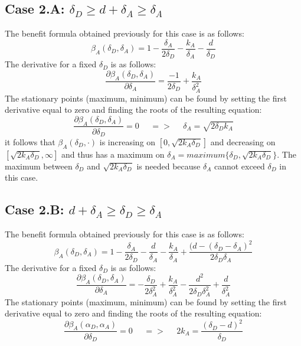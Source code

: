 \subsection*{Case 2.A: $\delta_{D} \geq d+\delta_{A} \geq \delta_{A} $ }
The benefit formula obtained previously for this case is as follows:
\begin{equation*}
\beta_{A}(\delta_{D},\delta_{A}) =1- \dfrac{\delta_{A}}{2\delta_{D}} - \dfrac{k_{A}}{\delta_{A}} - \dfrac{d}{\delta_{D}}
\end{equation*}
The derivative for a fixed $\delta_{D}$ is as follows:
\begin{equation*}
\dfrac{\partial \beta_{A}(\delta_{D},\delta_{A})}{\partial \delta_{A}} = \dfrac{-1}{2\delta_{D}} + \dfrac{k_{A}}{\delta_{A}^{2}}
\end{equation*}
The stationary points (maximum, minimum) can be found by setting the first derivative equal to zero and finding the roots of the resulting equation:
\begin{equation*}
\frac{\partial \beta_{A}(\delta_{D},\delta_{A})}{\partial \delta_{D}} =0 ~~~~~~ =>~~~~~~ \delta_{A} = \sqrt{2\delta_{D}k_{A}}
\end{equation*}
it follows that $\beta_{A}(\delta_{D},\cdot)$ is increasing on $[0,\sqrt{2k_{A}\delta_{D}}]$ and decreasing on $[\sqrt{2k_{A}\delta_{D}}, \infty]$ and thus has a maximum on $\delta_{A} = maximum \{\delta_{D}, \sqrt{2k_{A}\delta_{D}} \} $. The maximum between $\delta_{D}$ and $ \sqrt{2k_{A}\delta_{D}}$ is needed because $\delta_{A} $ cannot exceed $\delta_{D}$ in this case. \\

\subsection*{Case 2.B: $d+\delta_{A} \geq \delta_{D} \geq  \delta_{A} $} 

The benefit formula obtained previously for this case is as follows: 
\begin{equation*}
\beta_{A}(\delta_{D},\delta_{A}) = 1 - \dfrac{\delta_{A}}{2\delta_{D}} - \dfrac{d}{\delta_{A}} - \dfrac{k_{A}}{\delta_{A}} + \dfrac{(d-(\delta_{D}-\delta_{A})^{2}}{2\delta_{D}\delta_{A}} 
\end{equation*}
The derivative for a fixed $\delta_{D}$ is as follows:
\begin{equation*}
\dfrac{\partial \beta_{A}(\delta_{D},\delta_{A})}{\partial \delta_{A}} = -\dfrac{\delta_{D}}{2\delta_{A}^{2}} + \dfrac{k_{A}}{\delta_{A}^{2}} - \dfrac{d^{2}}{2\delta_{D}\delta_{A}^{2}} + \dfrac{d}{\delta_{A}^{2}}
\end{equation*}
The stationary points (maximum, minimum) can be found by setting the first derivative equal to zero and finding the roots of the resulting equation:
\begin{equation*}
\frac{\partial \beta_{A}(\alpha_{D},\alpha_{A})}{\partial \delta_{D}} =0 ~~~~~~ =>~~~~~~ 2k_{A} = \dfrac{(\delta_{D}-d)^{2}}{\delta_{D}}
\end{equation*}

